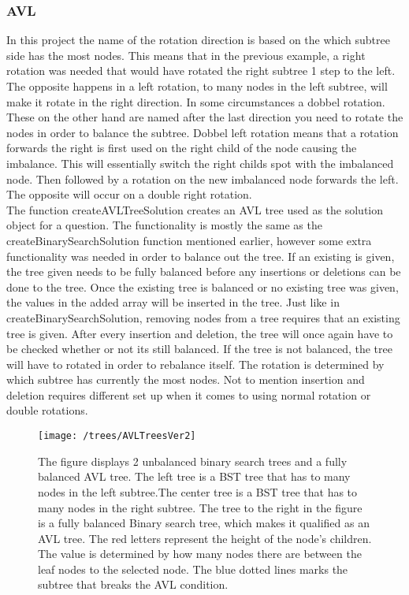 \subsubsection{AVL}
In this project the name of the rotation direction is based on the which subtree side has the most nodes. This means that in the previous example, a right rotation was needed that would have rotated the right subtree 1 step to the left. The opposite happens in a left rotation, to many nodes in the left subtree, will make it rotate in the right direction. In some circumstances a dobbel rotation. These on the other hand are named after the last direction you need to rotate the nodes in order to balance the subtree. Dobbel left rotation means that a rotation forwards the right is first used on the right child of the node causing the imbalance. This will essentially switch the right childs spot with the imbalanced node. Then followed by a rotation on the new imbalanced node forwards the left. The opposite will occur on a double right rotation.
\\[11pt]
The function createAVLTreeSolution creates an AVL tree used as the solution object for a question. The functionality is mostly the same as the createBinarySearchSolution function mentioned earlier, however some extra functionality was needed in order to balance out the tree. If an existing is given, the tree given needs to be fully balanced before any insertions or deletions can be done to the tree. Once the existing tree is balanced or no existing tree was given, the values in the added array will be inserted in the tree. Just like in createBinarySearchSolution, removing nodes from a tree requires that an existing tree is given. After every insertion and deletion, the tree will once again have to be checked whether or not its still balanced. If the tree is not balanced, the tree will have to rotated in order to rebalance itself. The rotation is determined by which subtree has currently the most nodes. Not to mention insertion and deletion requires different set up when it comes to using normal rotation or double rotations.
\begin{figure}[H]
	\centering
	\texttt{[image: /trees/AVLTreesVer2]}	
	\caption{The figure displays 2 unbalanced binary search trees and a fully balanced AVL tree. The left tree is a BST tree that has to many nodes in the left subtree.The center tree is a BST tree that has to many nodes in the right subtree. The tree to the right in the figure is a fully balanced Binary search tree, which makes it qualified as an AVL tree. The red letters represent the height of the node's children. The value is determined by how many nodes there are between the leaf nodes to the selected node. The blue dotted lines marks the subtree that breaks the AVL condition.}
	\label{fig:AVLTrees}
\end{figure}
